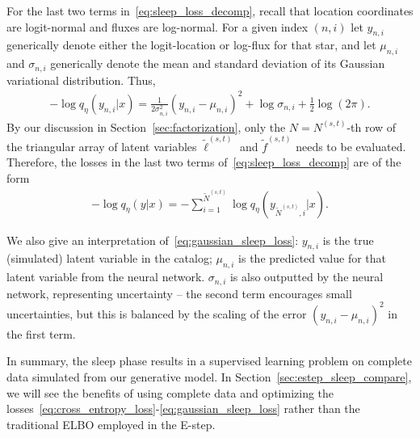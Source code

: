For the last two terms in~\eqref{eq:sleep_loss_decomp}, recall that location coordinates are logit-normal and fluxes are log-normal. For a given index $(n,i)$ let $y_{n,i}$ generically denote either the 
logit-location or log-flux for that star, 
and let $\mu_{n,i}$ and $\sigma_{n,i}$ generically denote the mean and standard deviation of its Gaussian variational distribution. Thus,
\begin{align}
    -\log q_\eta(y_{n,i} | x) = 
        \frac{1}{2\sigma^2_{n,i}}(y_{n,i} - \mu_{n,i})^2
         + \log\sigma_{n,i}
         + \frac{1}{2}\log(2\pi).
         \label{eq:gaussian_sleep_loss}
\end{align}
By our discussion in Section~\ref{sec:factorization}, 
only the $N = N^{(s,t)}$-th row of the triangular 
array of latent variables $\tilde \ell^{(s,t)}$ and $\tilde f^{(s,t)}$ needs to be evaluated. Therefore, the losses in the last two terms of~\eqref{eq:sleep_loss_decomp} are of the form 
\begin{align}
    -\log q_\eta(y | x) = -\sum_{i = 1}^{\tilde N^{(s,t)}} \log q_\eta(y_{\tilde N^{(s,t)},i} | x). 
\end{align}


We also give an interpretation of~\eqref{eq:gaussian_sleep_loss}: 
$y_{n,i}$ is the true (simulated) latent variable in the catalog; 
$\mu_{n,i}$ is the predicted value for that latent variable from the neural network. 
$\sigma_{n,i}$ is also outputted by the neural network, representing uncertainty -- the second term encourages small uncertainties, but this is 
balanced by the scaling of the error $(y_{n,i} - \mu_{n,i})^2$ in the first term. 

In summary, the sleep phase results in a supervised learning problem on complete data simulated from our generative model. In Section~\ref{sec:estep_sleep_compare}, we will see the benefits of using complete data and optimizing the losses~\eqref{eq:cross_entropy_loss}-\eqref{eq:gaussian_sleep_loss}  rather than the traditional ELBO employed in the E-step. 


